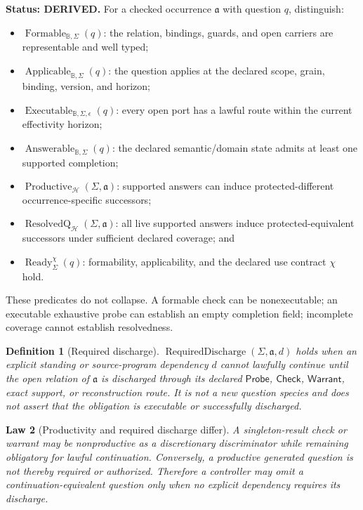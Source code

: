 \documentclass[11pt,oneside]{article}
\newtheorem{definition}{Definition}[section]
\newtheorem{law}[definition]{Law}
\newcommand{\B}{\mathbb B}
\newcommand{\Applicable}{\operatorname{Applicable}}
\newcommand{\Formable}{\operatorname{Formable}}
\newcommand{\Executable}{\operatorname{Executable}}
\newcommand{\Answerable}{\operatorname{Answerable}}
\newcommand{\Productive}{\operatorname{Productive}}
\newcommand{\ResolvedQ}{\operatorname{ResolvedQ}}
\newcommand{\Ready}{\operatorname{Ready}}
\newcommand{\RequiredDischarge}{\operatorname{RequiredDischarge}}
\newcommand{\AskRef}{\mathfrak a}
\begin{document}
\textbf{Status: DERIVED.}  For a checked occurrence \(\AskRef\) with question \(q\), distinguish:
\begin{itemize}
\item \(\Formable_{\B,\Sigma}(q)\): the relation, bindings, guards, and open carriers are
      representable and well typed;
\item \(\Applicable_{\B,\Sigma}(q)\): the question applies at the declared scope, grain, binding,
      version, and horizon;
\item \(\Executable_{\B,\Sigma,\epsilon}(q)\): every open port has a lawful route within the
      current effectivity horizon;
\item \(\Answerable_{\B,\Sigma}(q)\): the declared semantic/domain state admits at least one
      supported completion;
\item \(\Productive_{\mathcal H}(\Sigma,\AskRef)\): supported answers can induce
      protected-different occurrence-specific successors;
\item \(\ResolvedQ_{\mathcal H}(\Sigma,\AskRef)\): all live supported answers induce
      protected-equivalent successors under sufficient declared coverage; and
\item \(\Ready^{\chi}_{\Sigma}(q)\): formability, applicability, and the declared use contract
      \(\chi\) hold.
\end{itemize}
These predicates do not collapse.  A formable check can be nonexecutable; an executable exhaustive
probe can establish an empty completion field; incomplete coverage cannot establish resolvedness.

\begin{definition}[Required discharge]\label{def:required-discharge}
\(\RequiredDischarge(\Sigma,\AskRef,d)\) holds when an explicit standing or source-program
dependency \(d\) cannot lawfully continue until the open relation of \(\AskRef\) is discharged through
its declared \(\mathsf{Probe}\), \(\mathsf{Check}\), \(\mathsf{Warrant}\), exact support, or
reconstruction route.  It is not a new question species and does not assert that the obligation is
executable or successfully discharged.
\end{definition}

\begin{law}[Productivity and required discharge differ]\label{law:productive-required-discharge}
A singleton-result check or warrant may be nonproductive as a discretionary discriminator while
remaining obligatory for lawful continuation.  Conversely, a productive generated question is
not thereby required or authorized.  Therefore a controller may omit a continuation-equivalent
question only when no explicit dependency requires its discharge.
\end{law}
\end{document}
